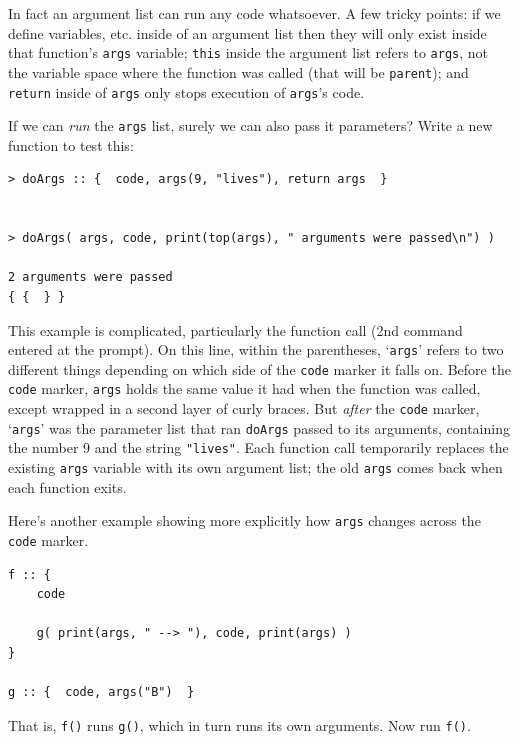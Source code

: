 \documentclass{article}
\newenvironment{code}{
       \begin{list}{}{
               \setlength{\leftmargin}{.4in}
               \setlength{\rightmargin}{0in}
               \setlength{\topsep}{.2in}
       }
       \small
       \item[] }
       { \end{list}   }
\begin{document}
\noindent In fact an argument list can run any code whatsoever.  A few tricky points:  if we define variables, etc. inside of an argument list then they will only exist inside that function's \verb#args# variable; \verb#this# inside the argument list refers to \verb#args#, not the variable space where the function was called (that will be \verb#parent#); and \verb#return# inside of \verb#args# only stops execution of \verb#args#'s code.

If we can \emph{run} the \texttt{args} list, surely we can also pass it parameters?  Write a new function to test this:

\begin{code} \begin{verbatim}
> doArgs :: {  code, args(9, "lives"), return args  }


> doArgs( args, code, print(top(args), " arguments were passed\n") )

2 arguments were passed
{ {  } }
\end{verbatim} \end{code}

\noindent This example is complicated, particularly the function call (2nd command entered at the prompt).  On this line, within the parentheses, `\texttt{args}' refers to two different things depending on which side of the \verb#code# marker it falls on.  Before the \verb#code# marker, \verb#args# holds the same value it had when the function was called, except wrapped in a second layer of curly braces.  But \emph{after} the \verb#code# marker, `\texttt{args}' was the parameter list that ran \texttt{doArgs} passed to its arguments, containing the number 9 and the string \verb#"lives"#.  Each function call temporarily replaces the existing \verb#args# variable with its own argument list; the old \verb#args# comes back when each function exits.

Here's another example showing more explicitly how \texttt{args} changes across the \texttt{code} marker.

\begin{code} \begin{verbatim}
f :: {
    code
    
    g( print(args, " --> "), code, print(args) )
}

g :: {  code, args("B")  }
\end{verbatim} \end{code}

\noindent That is, \texttt{f()} runs \texttt{g()}, which in turn runs its own arguments.  Now run \verb#f()#.
\end{document}

